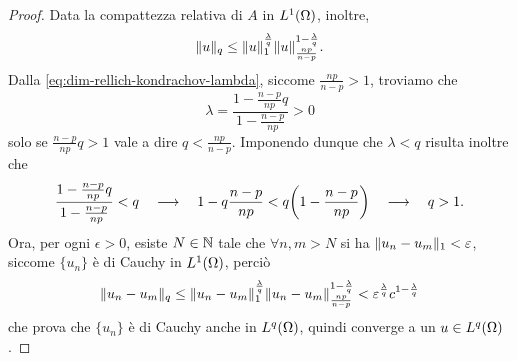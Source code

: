 \begin{proof}
    Data la compattezza relativa di $A$ in $\leb[1]{\Omega}$, inoltre,
    \begin{equation}
        \norm{u}_q\le\norm{u}_1^\frac{\lambda}{q}\norm{u}_\frac{np}{n-p}^{1-\frac{\lambda}{q}}.
    \end{equation}
    Dalla \eqref{eq:dim-rellich-kondrachov-lambda}, siccome $\frac{np}{n-p}>1$, troviamo che
    \begin{equation}
        \lambda=\frac{1-\frac{n-p}{np}q}{1-\frac{n-p}{np}}>0
    \end{equation}
    solo se $\frac{n-p}{np}q>1$ vale a dire $q<\frac{np}{n-p}$.
    Imponendo dunque che $\lambda<q$ risulta inoltre che
    \begin{equation}
        \frac{1-\frac{n-p}{np}q}{1-\frac{n-p}{np}}<q
        \qqq
        1-q\frac{n-p}{np}<q\biggl(1-\frac{n-p}{np}\biggr)
        \qqq
        q>1.
    \end{equation}
    Ora, per ogni $\epsilon>0$, esiste $N\in\N$ tale che $\forall n,m>N$ si ha $\norm{u_n-u_m}_1<\epsilon$, siccome $\{u_n\}$ è di Cauchy in $\leb[1]{\Omega}$, perciò
    \begin{equation}
        \norm{u_n-u_m}_q\le
        \norm{u_n-u_m}_1^\frac{\lambda}{q}\norm{u_n-u_m}_\frac{np}{n-p}^{1-\frac{\lambda}{q}}<\epsilon^\frac{\lambda}{q}c^{1-\frac{\lambda}{q}}
    \end{equation}
    che prova che $\{u_n\}$ è di Cauchy anche in $\leb[q]{\Omega}$, quindi converge a un $u\in\leb[q]{\Omega}$.
\end{proof}

